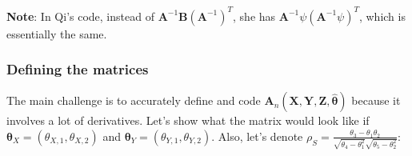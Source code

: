 \documentclass[]{article}
\begin{document}
\textbf{Note}: In Qi's code, instead of $\pmb{A}^{-1}\pmb{B} (\pmb{A}^{-1})^T$, she has $\pmb{A}^{-1}\psi (\pmb{A}^{-1}\psi)^T$, which is essentially the same.


\subsubsection{Defining the matrices}
The main challenge is to accurately define and code $\pmb{A}_n(\pmb{X}, \pmb{Y}, \pmb{Z}, \hat{\pmb{\theta}})$ because it involves a lot of derivatives. Let's show what the matrix would look like if $\pmb{\theta}_X = (\theta_{X, 1}, \theta_{X, 2})$ and $\pmb{\theta}_Y= (\theta_{Y, 1}, \theta_{Y, 2})$. Also, let's denote $\rho_S = \frac{\theta_3 - \theta_1\theta_2}{\sqrt{\theta_4 - \theta_1^2}\sqrt{\theta_5 - \theta_2^2}}$:
\end{document}

